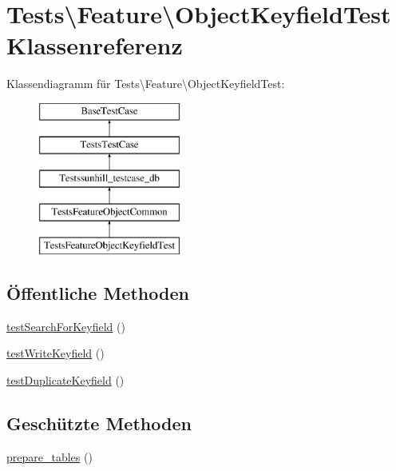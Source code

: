 \hypertarget{classTests_1_1Feature_1_1ObjectKeyfieldTest}{}\section{Tests\textbackslash{}Feature\textbackslash{}Object\+Keyfield\+Test Klassenreferenz}
\label{classTests_1_1Feature_1_1ObjectKeyfieldTest}
Klassendiagramm für Tests\textbackslash{}Feature\textbackslash{}Object\+Keyfield\+Test\+:\begin{figure}[H]
\begin{center}
\leavevmode
\includegraphics[height=5.000000cm]{d2/d15/classTests_1_1Feature_1_1ObjectKeyfieldTest}
\end{center}
\end{figure}
\subsection*{Öffentliche Methoden}
\begin{DoxyCompactItemize}
\item 
\hyperlink{classTests_1_1Feature_1_1ObjectKeyfieldTest_a8677576e5b7baae5ac3a9a305a2705f6}{test\+Search\+For\+Keyfield} ()
\item 
\hyperlink{classTests_1_1Feature_1_1ObjectKeyfieldTest_abeedf995352f3f94a7c43918fe08ff5a}{test\+Write\+Keyfield} ()
\item 
\hyperlink{classTests_1_1Feature_1_1ObjectKeyfieldTest_ab340da79558fc2be72fa41e0e7f13208}{test\+Duplicate\+Keyfield} ()
\end{DoxyCompactItemize}
\subsection*{Geschützte Methoden}
\begin{DoxyCompactItemize}
\item 
\hyperlink{classTests_1_1Feature_1_1ObjectKeyfieldTest_a5a17cf639663afd7614259bd92c68ed2}{prepare\+\_\+tables} ()
\end{DoxyCompactItemize}
